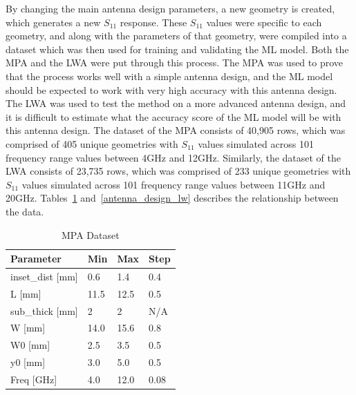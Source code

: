\documentclass[conference]{IEEEtran}
\begin{document}
By changing the main antenna design parameters, a new geometry is created, which generates a new $S_{11}$ response. These $S_{11}$ values were specific to each geometry, and along with the parameters of that geometry, were compiled into a dataset which was then used for training and validating the ML model. Both the MPA and the LWA were put through this process. The MPA was used to prove that the process works well with a simple antenna design, and the ML model should be expected to work with very high accuracy with this antenna design. The LWA was used to test the method on a more advanced antenna design, and it is difficult to estimate what the accuracy score of the ML model will be with this antenna design. The dataset of the MPA consists of 40,905 rows, which was comprised of 405 unique geometries with $S_{11}$ values simulated across 101 frequency range values between 4GHz and 12GHz. Similarly, the dataset of the LWA consists of 23,735 rows, which was comprised of 233 unique geometries with $S_{11}$ values simulated across 101 frequency range values between 11GHz and 20GHz. Tables~\ref{antenna_dataset_p} and~\ref{antenna_design_lw} describes the relationship between the data.

\begin{table}[h]
\caption{MPA Dataset}
\begin{center}
\begin{tabular}{ |l|l|l|l| }
    \hline
    Parameter & Min & Max & Step \\ 
    \hline
    inset\_dist [mm] & 0.6 & 1.4 & 0.4 \\
    \hline
    L [mm] & 11.5 & 12.5 & 0.5 \\
    \hline
    sub\_thick [mm] & 2 & 2 & N/A \\
    \hline
    W [mm] & 14.0 & 15.6 & 0.8 \\
    \hline
    W0 [mm] & 2.5 & 3.5 & 0.5 \\
    \hline
    y0 [mm] & 3.0 & 5.0 & 0.5 \\
    \hline
    Freq [GHz] & 4.0 & 12.0 & 0.08 \\
    \hline
\end{tabular}
\end{center}
\label{antenna_dataset_p}
\end{table}
\end{document}
